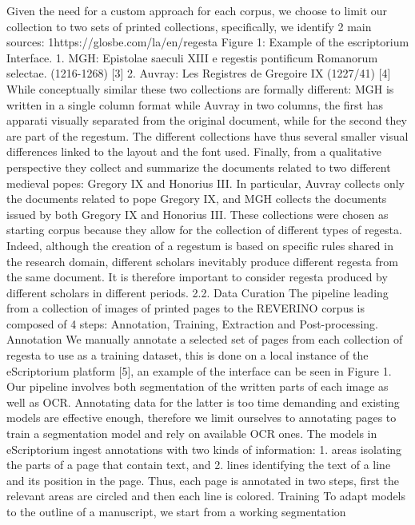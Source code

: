 {Given the need for a custom approach for each corpus, we choose to limit our collection to two sets
of printed collections, specifically, we identify 2 main sources:
1https://glosbe.com/la/en/regesta
Figure 1: Example of the escriptorium Interface.
1. MGH: Epistolae saeculi XIII e regestis pontificum Romanorum selectae. (1216-1268) [3]
2. Auvray: Les Registres de Gregoire IX (1227/41) [4]
While conceptually similar these two collections are formally different: MGH is written in a single
column format while Auvray in two columns, the first has apparati visually separated from the original
document, while for the second they are part of the regestum. The different collections have thus several
smaller visual differences linked to the layout and the font used.
Finally, from a qualitative perspective they collect and summarize the documents related to two
different medieval popes: Gregory IX and Honorius III. In particular, Auvray collects only the documents
related to pope Gregory IX, and MGH collects the documents issued by both Gregory IX and Honorius
III. These collections were chosen as starting corpus because they allow for the collection of different
types of regesta. Indeed, although the creation of a regestum is based on specific rules shared in the
research domain, different scholars inevitably produce different regesta from the same document. It is
therefore important to consider regesta produced by different scholars in different periods.
2.2. Data Curation
The pipeline leading from a collection of images of printed pages to the REVERINO corpus is composed
of 4 steps: Annotation, Training, Extraction and Post-processing.
Annotation We manually annotate a selected set of pages from each collection of regesta to use as a
training dataset, this is done on a local instance of the eScriptorium platform [5], an example of the
interface can be seen in Figure 1. Our pipeline involves both segmentation of the written parts of each
image as well as OCR. Annotating data for the latter is too time demanding and existing models are
effective enough, therefore we limit ourselves to annotating pages to train a segmentation model and
rely on available OCR ones.
The models in eScriptorium ingest annotations with two kinds of information: 1. areas isolating
the parts of a page that contain text, and 2. lines identifying the text of a line and its position in the
page. Thus, each page is annotated in two steps, first the relevant areas are circled and then each line is
colored.
Training To adapt models to the outline of a manuscript, we start from a working segmentation
}
